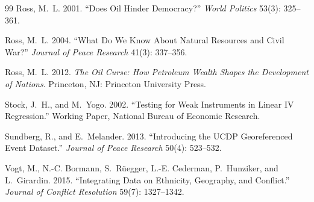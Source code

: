 \documentclass[12pt]{article}
\begin{document}
\begin{thebibliography}{99}
Ross, M.~L. 2001.
``Does Oil Hinder Democracy?''
\textit{World Politics} 53(3): 325--361.

Ross, M.~L. 2004.
``What Do We Know About Natural Resources and Civil War?''
\textit{Journal of Peace Research} 41(3): 337--356.

Ross, M.~L. 2012.
\textit{The Oil Curse: How Petroleum Wealth Shapes the Development of Nations}.
Princeton, NJ: Princeton University Press.

Stock, J.~H., and M.~Yogo. 2002.
``Testing for Weak Instruments in Linear IV Regression.''
Working Paper, National Bureau of Economic Research.

Sundberg, R., and E.~Melander. 2013.
``Introducing the UCDP Georeferenced Event Dataset.''
\textit{Journal of Peace Research} 50(4): 523--532.

Vogt, M., N.-C. Bormann, S.~R{\"u}egger, L.-E. Cederman, P.~Hunziker,
  and L.~Girardin. 2015.
``Integrating Data on Ethnicity, Geography, and Conflict.''
\textit{Journal of Conflict Resolution} 59(7): 1327--1342.

\end{thebibliography}
\end{document}

